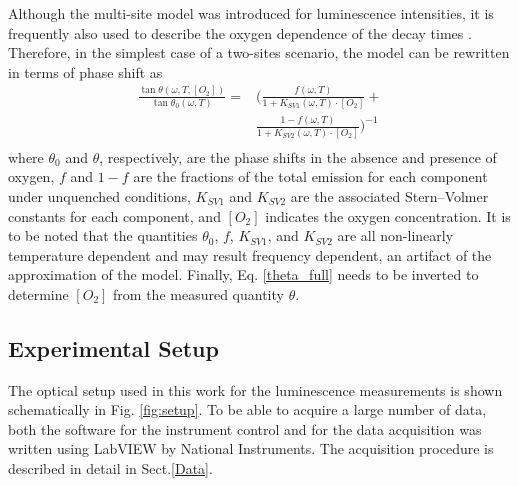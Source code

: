 \documentclass[9pt,twocolumn,twoside,pdftex]{optica}
\begin{document}
Although the multi-site model was introduced for luminescence intensities, it is frequently also used to describe the oxygen dependence of the decay times \cite{Demas1995,Quaranta2012}. Therefore, in the simplest case of a two-sites scenario, the model can be rewritten in terms of phase shift as \cite{Michelucci2019}
\begin{equation}
\begin{aligned}
\frac{\tan \theta (\omega, T, [O_2])}{\tan \theta_0 (\omega, T)} =& \bigg( \frac{f (\omega , T) }{1+K_{SV1} (\omega , T) \cdot \left[O_2\right]}+ \\
&\frac{1-f (\omega , T) }{1+K_{SV2} (\omega , T) \cdot \left[O_2\right]} \bigg)^{-1} \\
\label{theta_full}
\end{aligned}
\end{equation}
where $\theta_0$ and $\theta$, respectively, are the phase shifts in the absence and presence of oxygen, $f$ and $1-f$ are the fractions of the total emission for each component under unquenched conditions, $K_{SV1}$ and $K_{SV2}$ are the associated Stern–Volmer constants for each component, and $\left[O_2\right]$ indicates the oxygen concentration. It is to be noted that the quantities $\theta_0$, $f$, $K_{SV1}$, and $K_{SV2}$ are all non-linearly temperature dependent and may result frequency dependent, an artifact of the approximation of the model. Finally, Eq. \ref{theta_full} needs to be inverted to determine $[O_2]$ from the measured quantity $\theta$.


\subsection{Experimental Setup}
\label{Experimental}


The optical setup used in this work for the luminescence measurements is shown schematically in Fig. \ref{fig:setup}. To be able to acquire a large number of data, both the software for the instrument control and for the data acquisition was written using LabVIEW by National Instruments. The acquisition procedure is described in detail in Sect.\ref{Data}.
\end{document}
